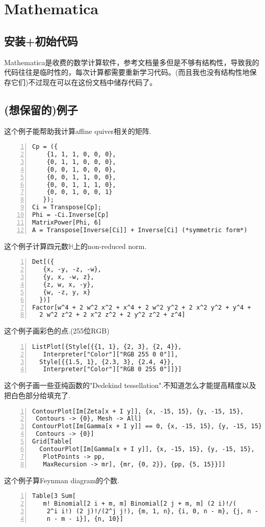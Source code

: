 \documentclass[11pt]{amsart}
\begin{document}
\section{Mathematica}
\subsection{安装+初始代码}
Mathematica是收费的数学计算软件，参考文档量多但是不够有结构性，导致我的代码往往是临时性的，每次计算都需要重新学习代码。(而且我也没有结构性地保存它们)不过现在可以在这份文档中储存代码了。

\subsection{(想保留的)例子}

这个例子能帮助我计算affine quiver相关的矩阵.
\begin{lstlisting}[numbers=left,numberstyle=\tiny,numbersep=10pt]
Cp = ({
    {1, 1, 1, 0, 0, 0},
    {0, 1, 1, 0, 0, 0},
    {0, 0, 1, 0, 0, 0},
    {0, 0, 1, 1, 0, 0},
    {0, 0, 1, 1, 1, 0},
    {0, 0, 1, 0, 0, 1}
   });
Ci = Transpose[Cp];
Phi = -Ci.Inverse[Cp]
MatrixPower[Phi, 6]
A = Transpose[Inverse[Ci]] + Inverse[Ci] (*symmetric form*)
\end{lstlisting}
这个例子计算四元数$\mathbb{H}$上的non-reduced norm.
\begin{lstlisting}[numbers=left,numberstyle=\tiny,numbersep=10pt]
Det[({
   {x, -y, -z, -w},
   {y, x, -w, z},
   {z, w, x, -y},
   {w, -z, y, x}
  })]
Factor[w^4 + 2 w^2 x^2 + x^4 + 2 w^2 y^2 + 2 x^2 y^2 + y^4 + 
  2 w^2 z^2 + 2 x^2 z^2 + 2 y^2 z^2 + z^4]
\end{lstlisting}
这个例子画彩色的点.(255位RGB)
\begin{lstlisting}[numbers=left,numberstyle=\tiny,numbersep=10pt]
ListPlot[{Style[{{1, 1}, {2, 3}, {2, 4}}, 
   Interpreter["Color"]["RGB 255 0 0"]], 
  Style[{{1.5, 1}, {2.3, 3}, {2.4, 4}}, 
   Interpreter["Color"]["RGB 0 255 0"]]}]
\end{lstlisting}
这个例子画一些亚纯函数的"Dedekind tessellation".不知道怎么才能提高精度以及把白色部分给填充了.
\begin{lstlisting}[numbers=left,numberstyle=\tiny,numbersep=10pt]
ContourPlot[Im[Zeta[x + I y]], {x, -15, 15}, {y, -15, 15}, 
 Contours -> {0}, Mesh -> All]
ContourPlot[Im[Gamma[x + I y]] == 0, {x, -15, 15}, {y, -15, 15}, 
 Contours -> {0}]
Grid[Table[
  ContourPlot[Im[Gamma[x + I y]], {x, -15, 15}, {y, -15, 15}, 
   PlotPoints -> pp, 
   MaxRecursion -> mr], {mr, {0, 2}}, {pp, {5, 15}}]]
\end{lstlisting}
这个例子算Feynman diagram的个数.
\begin{lstlisting}[numbers=left,numberstyle=\tiny,numbersep=10pt]
Table[3 Sum[
   m! Binomial[2 i + m, m] Binomial[2 j + m, m] (2 i)!/(
    2^i i!) (2 j)!/(2^j j!), {m, 1, n}, {i, 0, n - m}, {j, n - m - i, 
    n - m - i}], {n, 10}]
\end{lstlisting}
\end{document}
